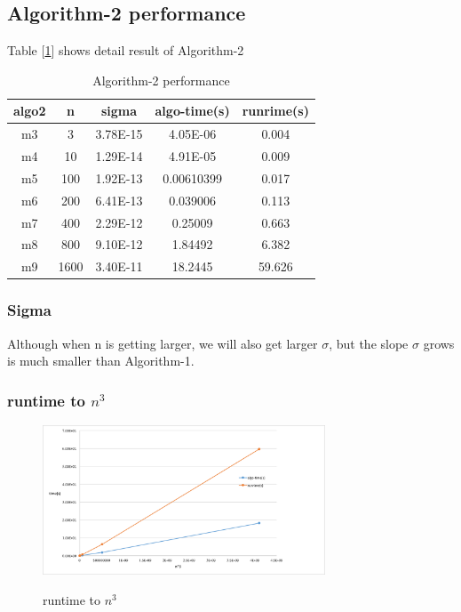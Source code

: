 \documentclass{article}
\begin{document}
\subsection{Algorithm-2 performance}
Table [\ref{tab:algo2}] shows detail result of Algorithm-2
\begin{table}[h]
    \centering
    \caption{Algorithm-2 performance}
    \begin{tabular}{|c|c|c|c|c|}
        \hline
        \textbf{algo2} & \multicolumn{1}{c|}{n} & \multicolumn{1}{c|}{sigma} & \multicolumn{1}{c|}{algo-time(s)} & \multicolumn{1}{c|}{runrime(s)} \bigstrut\\
        \hline
        m3  & 3   & 3.78E-15 & 4.05E-06 & 0.004 \bigstrut\\
        \hline
        m4  & 10  & 1.29E-14 & 4.91E-05 & 0.009 \bigstrut\\
        \hline
        m5  & 100 & 1.92E-13 & 0.00610399 & 0.017 \bigstrut\\
        \hline
        m6  & 200 & 6.41E-13 & 0.039006 & 0.113 \bigstrut\\
        \hline
        m7  & 400 & 2.29E-12 & 0.25009 & 0.663 \bigstrut\\
        \hline
        m8  & 800 & 9.10E-12 & 1.84492 & 6.382 \bigstrut\\
        \hline
        m9  & 1600 & 3.40E-11 & 18.2445 & 59.626 \bigstrut\\
        \hline
    \end{tabular}%

    \label{tab:algo2}
\end{table}%
\subsubsection{Sigma}
Although when n is getting larger, we will also get larger $\sigma$, but the slope $\sigma$ grows is much smaller than Algorithm-1.
\subsubsection{runtime to $n^3$}
\begin{figure}[H]
    \centering
    \caption{runtime to $n^3$}
    \includegraphics[width=0.75\textwidth]{src/algo2-runtime.png}
    \label{fig:algo2-runtime}
\end{figure}
\end{document}
